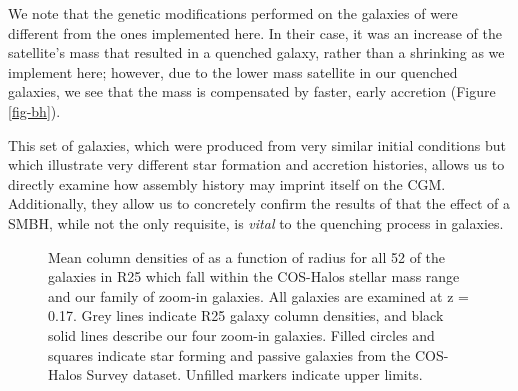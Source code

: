 \documentclass[]{emulateapj}
\begin{document}
We note that the genetic modifications performed on the galaxies of \citep{Pontzen2016} were different from the ones implemented here. In their case, it was an increase of the satellite's mass that resulted in a quenched galaxy, rather than a shrinking as we implement here; however, due to the lower mass satellite in our quenched galaxies, we see that the mass is compensated by faster, early accretion (Figure \ref{fig-bh}). 

This set of galaxies, which were produced from very similar initial conditions but which illustrate very different star formation and accretion histories, allows us to directly examine how assembly history may imprint itself on the CGM. Additionally, they allow us to concretely confirm the results of \cite{Pontzen2017a} that the effect of a SMBH, while not the only requisite, is \textit{vital} to the quenching process in galaxies. 



\vspace{-3mm}
\begin{figure}[ht!]
\centerline{}
\caption[]{Mean column densities of  as a function of radius for all 52 of the galaxies in R25 which fall within the COS-Halos stellar mass range and our family of zoom-in galaxies. All galaxies are examined at z = 0.17. Grey lines indicate R25 galaxy column densities, and black solid lines describe our four zoom-in galaxies. Filled circles and squares indicate star forming and passive galaxies from the COS-Halos Survey dataset. Unfilled markers indicate upper limits.}
\label{fig-ROM_GMs_NOvi}
\end{figure}
\end{document}
